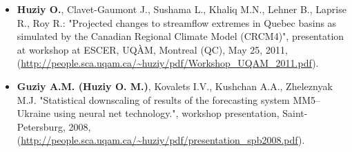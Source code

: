 \begin{itemize}
    \item \textbf{Huziy O.}, Clavet-Gaumont J., Sushama L., Khaliq M.N., Lehner
    B., Laprise R., Roy R.: "Projected changes to streamflow extremes in Quebec
    basins as simulated by the Canadian Regional Climate Model (CRCM4)",
    presentation at workshop at ESCER, UQÀM, Montreal (QC), May 25, 2011,
    (\url{http://people.sca.uqam.ca/~huziy/pdf/Workshop_UQAM_2011.pdf}).

    \item \textbf{Guziy A.M. (Huziy O. M.)}, Kovalets I.V., Kushchan A.A.,
    Zheleznyak M.J.
    "Statistical downscaling of results of the forecasting system MM5–Ukraine using neural net technology.",
    workshop presentation, Saint-Petersburg, 2008, (\url{http://people.sca.uqam.ca/~huziy/pdf/presentation_spb2008.pdf}).

\end{itemize}
